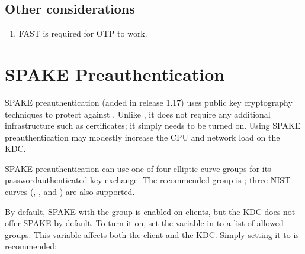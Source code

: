 \documentclass[letterpaper,10pt,english]{sphinxmanual}
\begin{document}
\section{Other considerations}
\label{\detokenize{admin/otp:other-considerations}}\begin{enumerate}
%
\item {} 
\sphinxAtStartPar
FAST is required for OTP to work.

\end{enumerate}


\chapter{SPAKE Preauthentication}
\label{\detokenize{admin/spake:spake-preauthentication}}\label{\detokenize{admin/spake:spake}}\label{\detokenize{admin/spake::doc}}
\sphinxAtStartPar
SPAKE preauthentication (added in release 1.17) uses public key
cryptography techniques to protect against {\hyperref[\detokenize{admin/dictionary:dictionary}]{}}.  Unlike {\hyperref[\detokenize{admin/pkinit:pkinit}]{}}, it does not
require any additional infrastructure such as certificates; it simply
needs to be turned on.  Using SPAKE preauthentication may modestly
increase the CPU and network load on the KDC.

\sphinxAtStartPar
SPAKE preauthentication can use one of four elliptic curve groups for
its password\sphinxhyphen{}authenticated key exchange.  The recommended group is
; three NIST curves (, , and
) are also supported.

\sphinxAtStartPar
By default, SPAKE with the  group is enabled on
clients, but the KDC does not offer SPAKE by default.  To turn it on,
set the  variable in {\hyperref[\detokenize{admin/conf_files/krb5_conf:libdefaults}]{}} to a
list of allowed groups.  This variable affects both the client and the
KDC.  Simply setting it to  is recommended:

\begin{sphinxVerbatim}[commandchars=\\\{\}]
\PYG{p}{[}\PYG{p}{]}
      
\end{sphinxVerbatim}
\end{document}
